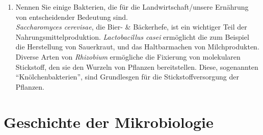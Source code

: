\begin{enumerate}
		\item Nennen Sie einige Bakterien, die für die Landwirtschaft/unsere Ernährung von entscheidender Bedeutung sind. \hfill \\
		
		\emph{Saccharomyces cerevisae}, die Bier- \& Bäckerhefe,
		ist ein wichtiger Teil der Nahrungsmittelproduktion.
		\emph{Lactobacillus casei} ermöglicht die zum Beispiel die Herstellung von Sauerkraut,
		und das Haltbarmachen von Milchprodukten.
		Diverse Arten von \emph{Rhizobium} ermögliche die Fixierung von molekularen Stickstoff,
		den sie den Wurzeln von Pflanzen bereitstellen.
		Diese, sogenannten ``Knölchenbakterien'', sind Grundlesgen für die Stickstoffversorgung der Pflanzen.
	\end{enumerate}

\section{Geschichte der Mikrobiologie}
